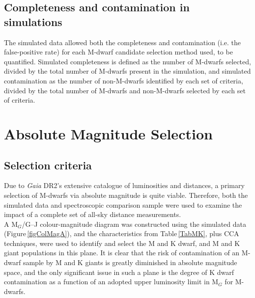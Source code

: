 \subsection{Completeness and contamination in simulations}
The simulated data allowed both the completeness and contamination (i.e. the false-positive rate) for each M-dwarf candidate selection method used, to be quantified. Simulated completeness is defined as the number of M-dwarfs selected, divided by the total number of M-dwarfs present in the simulation, and simulated contamination as the number of non-M-dwarfs identified by each set of criteria, divided by the total number of M-dwarfs and non-M-dwarfs selected by each set of criteria.
\section{Absolute Magnitude Selection}
\subsection{Selection criteria}
\label{secAbs}
Due to {\em Gaia} DR2's extensive catalogue of luminosities and distances, a primary selection of M-dwarfs via absolute magnitude is quite viable. Therefore, both the simulated data and spectroscopic comparison sample were used to examine the impact of a complete set of all-sky distance measurements.\\

A M$_G$/G--J colour-magnitude diagram was constructed using the simulated data (Figure\,\ref{figColMagA}), and the characteristics from Table\,\ref{TabMK}, plus CCA techniques, were used to identify and select the M and K dwarf, and M and K giant populations in this plane. It is clear that the risk of contamination of an M-dwarf sample by M and K giants is greatly diminished in absolute magnitude space, and the only significant issue in such a plane is the degree of K dwarf contamination as a function of an adopted upper luminosity limit in M$_G$ for M-dwarfs.\\

